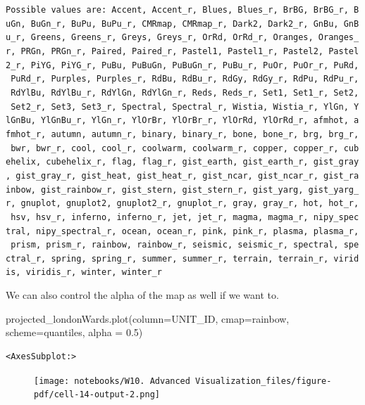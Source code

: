 \documentclass[
  letterpaper,
  DIV=11,
  numbers=noendperiod]{scrreprt}
\newenvironment{Shaded}{\begin{snugshade}}{\end{snugshade}}
\newcommand{\FloatTok}[1]{\textcolor[rgb]{0.68,0.00,0.00}{#1}}
\newcommand{\NormalTok}[1]{\textcolor[rgb]{0.00,0.23,0.31}{#1}}
\newcommand{\OperatorTok}[1]{\textcolor[rgb]{0.37,0.37,0.37}{#1}}
\newcommand{\StringTok}[1]{\textcolor[rgb]{0.13,0.47,0.30}{#1}}
\begin{document}
\texttt{Possible\ values\ are:\ Accent,\ Accent\_r,\ Blues,\ Blues\_r,\ BrBG,\ BrBG\_r,\ BuGn,\ BuGn\_r,\ BuPu,\ BuPu\_r,\ CMRmap,\ CMRmap\_r,\ Dark2,\ Dark2\_r,\ GnBu,\ GnBu\_r,\ Greens,\ Greens\_r,\ Greys,\ Greys\_r,\ OrRd,\ OrRd\_r,\ Oranges,\ Oranges\_r,\ PRGn,\ PRGn\_r,\ Paired,\ Paired\_r,\ Pastel1,\ Pastel1\_r,\ Pastel2,\ Pastel2\_r,\ PiYG,\ PiYG\_r,\ PuBu,\ PuBuGn,\ PuBuGn\_r,\ PuBu\_r,\ PuOr,\ PuOr\_r,\ PuRd,\ PuRd\_r,\ Purples,\ Purples\_r,\ RdBu,\ RdBu\_r,\ RdGy,\ RdGy\_r,\ RdPu,\ RdPu\_r,\ RdYlBu,\ RdYlBu\_r,\ RdYlGn,\ RdYlGn\_r,\ Reds,\ Reds\_r,\ Set1,\ Set1\_r,\ Set2,\ Set2\_r,\ Set3,\ Set3\_r,\ Spectral,\ Spectral\_r,\ Wistia,\ Wistia\_r,\ YlGn,\ YlGnBu,\ YlGnBu\_r,\ YlGn\_r,\ YlOrBr,\ YlOrBr\_r,\ YlOrRd,\ YlOrRd\_r,\ afmhot,\ afmhot\_r,\ autumn,\ autumn\_r,\ binary,\ binary\_r,\ bone,\ bone\_r,\ brg,\ brg\_r,\ bwr,\ bwr\_r,\ cool,\ cool\_r,\ coolwarm,\ coolwarm\_r,\ copper,\ copper\_r,\ cubehelix,\ cubehelix\_r,\ flag,\ flag\_r,\ gist\_earth,\ gist\_earth\_r,\ gist\_gray,\ gist\_gray\_r,\ gist\_heat,\ gist\_heat\_r,\ gist\_ncar,\ gist\_ncar\_r,\ gist\_rainbow,\ gist\_rainbow\_r,\ gist\_stern,\ gist\_stern\_r,\ gist\_yarg,\ gist\_yarg\_r,\ gnuplot,\ gnuplot2,\ gnuplot2\_r,\ gnuplot\_r,\ gray,\ gray\_r,\ hot,\ hot\_r,\ hsv,\ hsv\_r,\ inferno,\ inferno\_r,\ jet,\ jet\_r,\ magma,\ magma\_r,\ nipy\_spectral,\ nipy\_spectral\_r,\ ocean,\ ocean\_r,\ pink,\ pink\_r,\ plasma,\ plasma\_r,\ prism,\ prism\_r,\ rainbow,\ rainbow\_r,\ seismic,\ seismic\_r,\ spectral,\ spectral\_r,\ spring,\ spring\_r,\ summer,\ summer\_r,\ terrain,\ terrain\_r,\ viridis,\ viridis\_r,\ winter,\ winter\_r}

We can also control the alpha of the map as well if we want to.

\begin{Shaded}
\begin{Highlighting}[]
\NormalTok{projected\_londonWards.plot(column}\OperatorTok{=}\StringTok{\textquotesingle{}UNIT\_ID\textquotesingle{}}\NormalTok{, cmap}\OperatorTok{=}\StringTok{\textquotesingle{}rainbow\textquotesingle{}}\NormalTok{, scheme}\OperatorTok{=}\StringTok{\textquotesingle{}quantiles\textquotesingle{}}\NormalTok{, alpha }\OperatorTok{=} \FloatTok{0.5}\NormalTok{)}
\end{Highlighting}
\end{Shaded}

\begin{verbatim}
<AxesSubplot:>
\end{verbatim}

\begin{figure}[H]

{\centering \texttt{[image: notebooks/W10. Advanced Visualization\_files/figure-pdf/cell-14-output-2.png]}

}

\end{figure}
\end{document}
